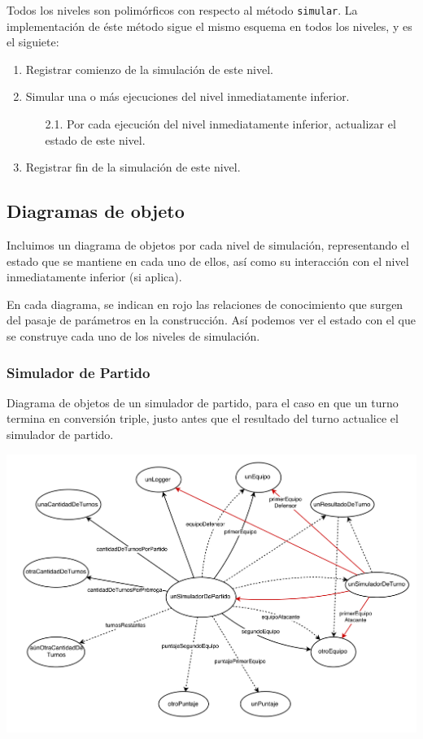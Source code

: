 Todos los niveles son polimórficos con respecto al método \texttt{simular}. La implementación de éste método sigue el mismo esquema en todos los niveles, y es el siguiete:

\begin{enumerate}
  \item Registrar comienzo de la simulación de este nivel.
  \item Simular una o más ejecuciones del nivel inmediatamente inferior.
  \begin{enumerate}
  \item[2.1.] Por cada ejecución del nivel inmediatamente inferior, actualizar el estado de este nivel.
  \end{enumerate}
  \item Registrar fin de la simulación de este nivel.
\end{enumerate}

\subsection{Diagramas de objeto}

Incluimos un diagrama de objetos por cada nivel de simulación, representando el estado que se mantiene en cada uno de ellos, así como su interacción con el nivel inmediatamente inferior (si aplica).

En cada diagrama, se indican en rojo las relaciones de conocimiento que surgen del pasaje de parámetros en la construcción. Así podemos ver el estado con el que se construye cada uno de los niveles de simulación.

\subsubsection{Simulador de Partido}
Diagrama de objetos de un simulador de partido, para el caso en que un turno termina en conversi\'on triple, justo antes que el resultado del turno actualice el simulador de partido.

\begin{center}
\includegraphics[width=15cm]{diagramas/DO1}
\end{center}

